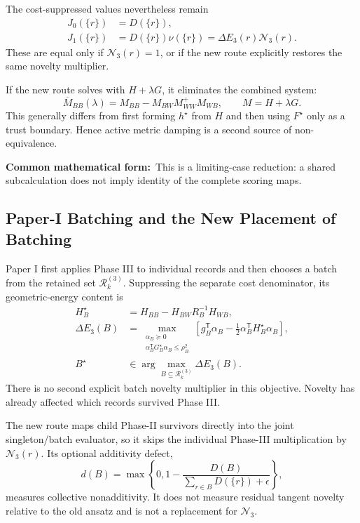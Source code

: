 \documentclass[10pt,twocolumn]{article}
\newcommand{\form}[1]{\par\noindent\textbf{Common mathematical form:}\ #1\par}
\begin{document}
The cost-suppressed values nevertheless remain
\begin{align*}
J_0(\{r\})
&=D(\{r\}),\\
J_1(\{r\})
&=D(\{r\})\nu(\{r\})
=\Delta E_3(r)\mathcal N_3(r).
\end{align*}
These are equal only if \(\mathcal N_3(r)=1\), or if the new route explicitly
restores the same novelty multiplier.

If the new route solves with \(H+\lambda G\), it eliminates the combined
system:
\begin{equation}
\overline M_{BB}(\lambda)
=M_{BB}-M_{BW}M_{WW}^+M_{WB},
\qquad M=H+\lambda G.
\label{eq:audit-combined-schur}
\end{equation}
This generally differs from first forming \(h^\star\) from \(H\) and then
using \(F^\star\) only as a trust boundary. Hence active metric damping is a
second source of non-equivalence.

\form{This is a limiting-case reduction: a shared subcalculation does not imply
identity of the complete scoring maps.}

\subsection*{Paper-I Batching and the New Placement of Batching}

Paper I first applies Phase III to individual records and then chooses a batch
from the retained set \(\mathcal R_k^{(3)}\). Suppressing the separate cost
denominator, its geometric-energy content is
\begin{align*}
H_B^\star
&=H_{BB}-H_{BW}R_B^{-1}H_{WB},\\
\Delta E_3(B)
&=\max_{\substack{\alpha_B\succeq0\\
\alpha_B^{\mathsf T}G_B^\star\alpha_B\le\rho_B^2}}
\left[g_B^{\mathsf T}\alpha_B
-\frac12\alpha_B^{\mathsf T}H_B^\star\alpha_B\right],\\
B^\star
&\in\arg\max_{B\subseteq\mathcal R_k^{(3)}}
\Delta E_3(B).
\end{align*}
There is no second explicit batch novelty multiplier in this objective.
Novelty has already affected which records survived Phase III.

The new route maps child Phase-II survivors directly into the joint
singleton/batch evaluator, so it skips the individual Phase-III multiplication
by \(\mathcal N_3(r)\).
Its optional additivity defect,
\[
d(B)
=\max\!\left\{0,
1-\frac{D(B)}
{\sum_{r\in B}D(\{r\})+\epsilon}
\right\},
\]
measures collective nonadditivity. It does not measure residual tangent novelty
relative to the old ansatz and is not a replacement for \(\mathcal N_3\).
\end{document}

